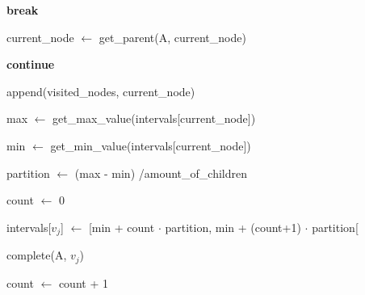 \begin{algorithm}
\begin{algorithmic}


 

\State \textbf{break} 

\Else

\State current\_node $\gets$ get\_parent(A, current\_node)

\State \textbf{continue}

\EndIf

\EndIf


\State append(visited\_nodes, current\_node)

\State max $\gets$ get\_max\_value(intervals[current\_node])

\State min $\gets$ get\_min\_value(intervals[current\_node]) 

\State partition $\gets$ (max - min) \slash amount\_of\_children

\State count $\gets$ 0


\State intervals[$v_{j}$] $\gets$ [min + count $\cdot$  partition, min + (count+1) $\cdot$  partition[

\State complete(A, $v_{j}$)

\State count $\gets$ count + 1

\EndFor

\EndIf


\end{algorithmic}
\end{algorithm}


